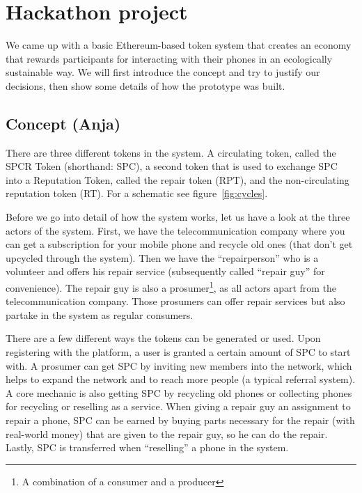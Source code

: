 \documentclass[11pt]{scrartcl}
\begin{document}
\section{Hackathon project}

We came up with a basic Ethereum-based token system that creates an economy that
rewards participants for interacting with their phones in an ecologically sustainable
way. We will first introduce the concept and try to justify our decisions, then
show some details of how the prototype was built.

\subsection{Concept (Anja)}
There are three different tokens in the system. A circulating token, called the SPCR Token (shorthand: SPC), a  second token that is used to exchange SPC into a Reputation Token, called the repair token (RPT), and the non-circulating reputation token (RT). For a schematic see figure~\ref{fig:cycles}.

Before we go into detail of how the system works, let us have a look at the three actors of the system. First, we have the telecommunication company where you can get a subscription for your mobile phone and recycle old ones (that don't get upcycled through the system). Then we have the ``repairperson'' who is a volunteer and offers his repair service (subsequently called ``repair guy'' for convenience). The repair guy is also a prosumer\footnote{A combination of a consumer and a producer}, as all actors apart from the telecommunication company. Those prosumers can offer repair services but also partake in the system as regular consumers.

There are a few different ways the tokens can be generated or used. Upon registering with the platform, a user is granted a certain amount of SPC to start with. A prosumer can get SPC by inviting new members into the network, which helps to expand the network and to reach more people (a typical referral system). A core mechanic is also getting  SPC by recycling old phones or collecting phones for recycling or reselling  as a service. When giving a repair guy an assignment to repair a phone, SPC can be earned by buying parts necessary for the repair (with real-world money) that are given to the repair guy, so he can do the repair. Lastly, SPC is transferred when ``reselling'' a phone in the system.
\end{document}

